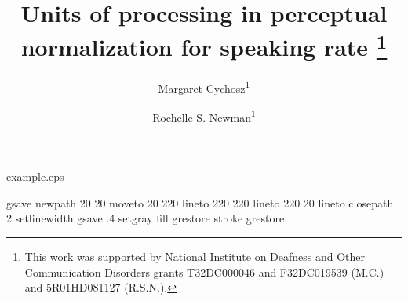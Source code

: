 %
%
%
%
%
\begin{filecontents*}{example.eps}

gsave
newpath
  20 20 moveto
  20 220 lineto
  220 220 lineto
  220 20 lineto
closepath
2 setlinewidth
gsave
  .4 setgray fill
grestore
stroke
grestore
\end{filecontents*}
%
\RequirePackage{fix-cm}
%
\documentclass[smallcondensed,natbib,apacite]{svjour3}       %

\smartqed  %
\usepackage{graphicx}
\usepackage{makecell}
\usepackage{multirow}
\usepackage[T1]{tipa}
\usepackage{hyperref} %
\usepackage{float} %
\usepackage{indentfirst} %
\usepackage{setspace} %
\doublespacing

 \journalname{}
%


\title{Units of processing in perceptual normalization for speaking rate \thanks{This work was supported by National Institute on Deafness and Other Communication Disorders grants T32DC000046 and F32DC019539 (M.C.) and 5R01HD081127 (R.S.N.).}}




\author{Margaret Cychosz\textsuperscript{1} \and
        Rochelle S. Newman\textsuperscript{1}
}



